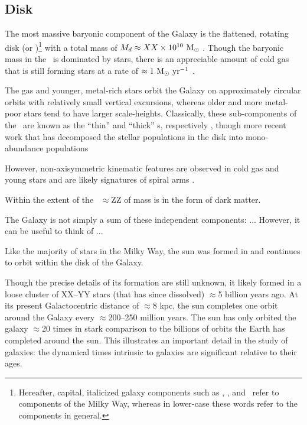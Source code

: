 \subsection{Disk}

The most massive baryonic component of the Galaxy is the flattened, rotating disk (or \mwdisk)\footnote{Hereafter, capital, italicized galaxy components such as \mwdisk, \mwbulge, and \mwhalo\ refer to components of the Milky Way, whereas in lower-case these words refer to the components in general.} with a total mass of $M_d \approx XX \times 10^{10}~\mathrm{M}_\odot$ \citep{todo}. Though the baryonic mass in the \mwdisk\ is dominated by stars, there is an appreciable amount of cold gas \citep[$YY \times 10^ZZ~\msun$;][]{todo} that is still forming stars at a rate of $\approx 1~\mathrm{M}_\odot~{\rm yr}^{-1}$ \citep{todo}. 

The gas and younger, metal-rich stars orbit the Galaxy on approximately circular orbits with relatively small vertical excursions, whereas older and more metal-poor stars tend to have larger scale-heights. Classically, these sub-components of the \mwdisk\ are known as the ``thin'' and ``thick'' \mwdisk s, respectively \citep{todo}, though more recent work that has decomposed the stellar populations in the disk into mono-abundance populations

However, non-axisymmetric kinematic features are observed in cold gas \citep{todo} and young stars \citep[cepheids;][]{todo} and are likely signatures of spiral arms \citep{todo}.

Within the extent of the \mwdisk\, $\approx$ZZ of mass is in the form of dark matter. 

The Galaxy is not simply a sum of these independent components: ... However, it can be useful to think of ...

Like the majority of stars in the Milky Way, the sun was formed in and continues to orbit within the disk of the Galaxy. 

Though the precise details of its formation are still unknown, it likely formed in a loose cluster of XX--YY stars (that has since dissolved) $\approx$5 billion years ago. At its present Galactocentric distance of $\approx$8 kpc, the sun completes one orbit around the Galaxy every $\approx$200--250 million years. The sun has only orbited the galaxy $\approx$20 times in stark comparison to the billions of orbits the Earth has completed around the sun. This illustrates an important detail in the study of galaxies: the dynamical times intrinsic to galaxies are significant relative to their ages.

